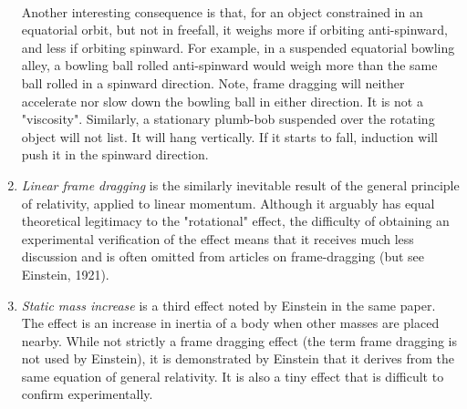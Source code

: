 \begin{enumerate}
	\\
	Another interesting consequence is that, for an object constrained in an equatorial orbit, but not in freefall, it weighs more if orbiting anti-spinward, and less if orbiting spinward. For example, in a suspended equatorial bowling alley, a bowling ball rolled anti-spinward would weigh more than the same ball rolled in a spinward direction. Note, frame dragging will neither accelerate nor slow down the bowling ball in either direction. It is not a "viscosity". Similarly, a stationary plumb-bob suspended over the rotating object will not list. It will hang vertically. If it starts to fall, induction will push it in the spinward direction.
	
	\item \emph{Linear frame dragging} is the similarly inevitable result of the general principle of relativity, applied to linear momentum. Although it arguably has equal theoretical legitimacy to the "rotational" effect, the difficulty of obtaining an experimental verification of the effect means that it receives much less discussion and is often omitted from articles on frame-dragging (but see Einstein, 1921).
	
	\item \emph{Static mass increase} is a third effect noted by Einstein in the same paper. The effect is an increase in inertia of a body when other masses are placed nearby. While not strictly a frame dragging effect (the term frame dragging is not used by Einstein), it is demonstrated by Einstein that it derives from the same equation of general relativity. It is also a tiny effect that is difficult to confirm experimentally.
	
	
\end{enumerate}


















